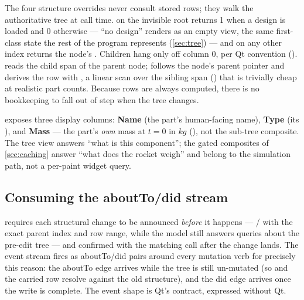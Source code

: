 The four structure overrides never consult stored rows; they walk the authoritative tree at call
time.  on the invisible root returns 1 when a design is loaded and 0 otherwise
--- ``no design'' renders as an empty view, the same first-class state the rest of the program
represents (\cref{sec:tree}) --- and on any other index returns the node's
. Children hang only off column 0, per Qt convention
().  reads the child span of the
parent node;  follows the node's parent pointer and derives the row with
, a linear scan over the sibling span
() that is trivially cheap at realistic part counts. Because
rows are always computed, there is no bookkeeping to fall out of step when the tree changes.

 exposes three display columns: \textbf{Name} (the part's human-facing name),
\textbf{Type} (its ), and \textbf{Mass} --- the part's \emph{own} mass at
$t = 0$ in $\unit{kg}$ (), not the sub-tree composite. The tree
view answers ``what is this component''; the gated composites of \cref{sec:caching} answer ``what
does the rocket weigh'' and belong to the simulation path, not a per-paint widget query.

\subsection{Consuming the aboutTo/did stream}\label{sec:gui-events}

\begin{designrule}
 requires each structural change to be announced \emph{before} it
happens --- / with the exact parent index and row
range, while the model still answers queries about the pre-edit tree --- and confirmed with the
matching  call after the change lands. The event stream fires as aboutTo/did pairs
around every mutation verb for precisely this reason: the aboutTo edge arrives while the tree is
still un-mutated (so  and the carried row resolve against the old
structure), and the did edge arrives once the write is complete. The event shape is Qt's contract,
expressed without Qt.
\end{designrule}

